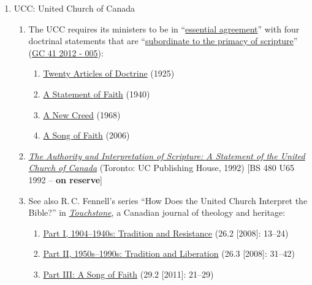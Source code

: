 \documentclass[titlepage]{article}
\begin{document}
\begin{enumerate}
\item UCC: United Church of Canada

	\begin{enumerate}
	\item The UCC requires its ministers to be in ``\href{http://www.united-church.ca/community-faith/welcome-united-church-canada/what-we-believe}{essential agreement}'' with four doctrinal statements that are ``\href{http://www.united-church.ca/community-faith/welcome-united-church-canada/faith-statements}{subordinate to the primacy of scripture}'' (\href{https://commons.united-church.ca/Documents/What%20We%20Believe%20and%20Why/Theology%20and%20Mission%20of%20the%20Church/Our%20Words%20of%20Faith.pdf#search=study}{GC 41 2012 - 005}):
		\begin{enumerate}
			\item\href{http://www.united-church.ca/community-faith/welcome-united-church-canada/twenty-articles-doctrine-1925}{Twenty Articles of Doctrine} (1925)
			\item\href{http://www.united-church.ca/community-faith/welcome-united-church-canada/statement-faith-1940}{A Statement of Faith} (1940)
			\item\href{http://www.united-church.ca/community-faith/welcome-united-church-canada/new-creed}{A New Creed} (1968)
			\item\href{http://www.united-church.ca/community-faith/welcome-united-church-canada/song-faith}{A Song of Faith} (2006)
		\end{enumerate}
	\item \href{https://ecumenism.net/archive/docu/1992_ucc_authority_interpretation_scripture.pdf}{\emph{The Authority and Interpretation of Scripture: A Statement of the United Church of Canada}} (Toronto: UC Publishing House, 1992) [BS 480 U65 1992 -- \textbf{on reserve}]
	\item See also R.\,C. Fennell's series “How Does the United Church Interpret the Bible?” in \href{http://touchstonecanada.ca}{\emph{Touchstone}}, a Canadian journal of theology and heritage:
		\begin{enumerate}
			\item\href{http://touchstonecanada.ca/wp-content/uploads/2013/08/Article2_2008-051.pdf}{Part I, 1904–1940s: Tradition and Resistance} (26.2 [2008]: 13--24)
			\item\href{http://touchstonecanada.ca/wp-content/uploads/2013/08/3rdArticle_2008-09.pdf}{Part II, 1950s–1990s: Tradition and Liberation} (26.3 [2008]: 31--42)
			\item\href{http://touchstonecanada.ca/wp-content/uploads/2013/08/Touchstone_May_2011.pdf}{Part III: A Song of Faith} (29.2 [2011]: 21--29)
		\end{enumerate}
	\end{enumerate}

\end{enumerate}
\end{document}
